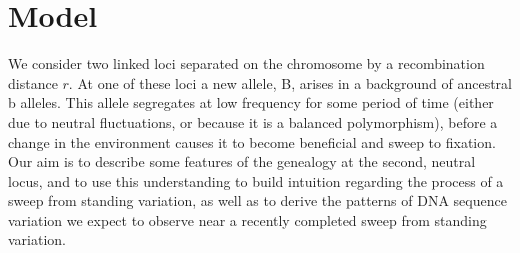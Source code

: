 \documentclass[a4paper,10pt]{article}
\newcommand{\gc}[1]{{\it \color{red} (#1)} }
\newcommand{\jb}[1]{{\it\color{blue} (#1)} }
\begin{document}
%
%
%
%
%
\section{Model}


We consider two linked loci separated on the chromosome by a recombination distance $r$. At one of these loci a new allele, B, arises in a background of ancestral b alleles. This allele segregates at low frequency for some period of time (either due to neutral fluctuations, or because it is a balanced polymorphism), before a change in the environment causes it to become beneficial and sweep to fixation. Our aim is to describe some features of the genealogy at the second, neutral locus, and to use this understanding to build intuition regarding the process of a sweep from standing variation, as well as to derive the patterns of DNA sequence variation we expect to observe near a recently completed sweep from standing variation.
\end{document}
